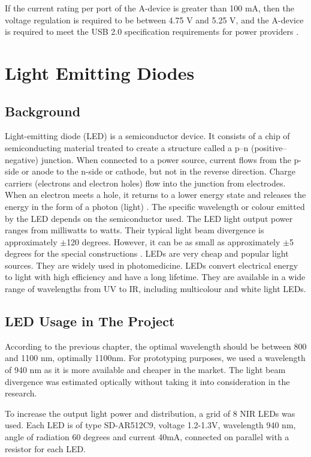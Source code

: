 If the current rating per port of the A-device is greater than 100 mA, then the voltage regulation is required to be between 4.75 V and 5.25 V, and the A-device is required to meet the USB 2.0 specification requirements for power providers \parencite{otg}.


\section{Light Emitting Diodes}
\subsection{Background}
Light-emitting diode (LED) is a semiconductor device. It consists of a chip of semiconducting material treated to create a structure called a p–n (positive–negative) junction. When connected to a power source, current flows from the p-side or anode to the n-side or cathode, but not in the reverse direction. Charge carriers (electrons and electron holes) flow into the junction from electrodes. When an electron meets a hole, it returns to a lower energy state and releases the energy in the form of a photon (light) \parencite{led}. The specific wavelength or colour emitted by the LED depends on the semiconductor used. The LED light output power ranges from milliwatts to watts. Their typical light beam divergence is approximately $\pm$120 degrees. However, it can be as small as approximately $\pm$5 degrees for the special constructions \parencite{led}. LEDs are very cheap and popular light sources. They are widely used in photomedicine. LEDs convert electrical energy to light with high efficiency and have a long lifetime. They are available in a wide range of wavelengths from UV to IR, including multicolour and white light LEDs. 

\subsection{LED Usage in The Project}

According to the previous chapter, the optimal wavelength should be between 800 and 1100 nm, optimally 1100nm. For prototyping purposes, we used a wavelength of 940 nm as it is more available and cheaper in the market. The light beam divergence was estimated optically without taking it into consideration in the research.

To increase the output light power and distribution, a grid of 8 NIR LEDs was used. Each LED is of type SD-AR512C9, voltage 1.2-1.3V, wavelength 940 nm, angle of radiation 60 degrees and current 40mA, connected on parallel with a resistor for each LED. 

